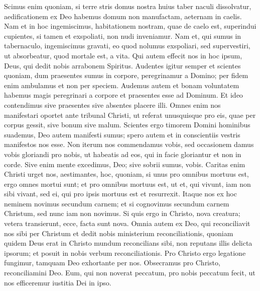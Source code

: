 \begin{biblechapter}  
\verse Scimus enim quoniam, si terre stris domus nostra huius taber naculi dissolvatur, aedificationem ex Deo habemus domum non manufactam, aeternam in caelis. 
\verse Nam et in hoc ingemiscimus, habitationem nostram, quae de caelo est, superindui cupientes, 
\verse si tamen et exspoliati, non nudi inveniamur. 
\verse Nam et, qui sumus in tabernaculo, ingemiscimus gravati, eo quod nolumus exspoliari, sed supervestiri, ut absorbeatur, quod mortale est, a vita. 
\verse Qui autem effecit nos in hoc ipsum, Deus, qui dedit nobis arrabonem Spiritus. 
\verse Audentes igitur semper et scientes quoniam, dum praesentes sumus in corpore, peregrinamur a Domino; 
\verse per fidem enim ambulamus et non per speciem. 
\verse Audemus autem et bonam voluntatem habemus magis peregrinari a corpore et praesentes esse ad Dominum. 
\verse Et ideo contendimus sive praesentes sive absentes placere illi. 
\verse Omnes enim nos manifestari oportet ante tribunal Christi, ut referat unusquisque pro eis, quae per corpus gessit, sive bonum sive malum. 
\verse Scientes ergo timorem Domini hominibus suademus, Deo autem manifesti sumus; spero autem et in conscientiis vestris manifestos nos esse. 
\verse Non iterum nos commendamus vobis, sed occasionem damus vobis gloriandi pro nobis, ut habeatis ad eos, qui in facie gloriantur et non in corde. 
\verse Sive enim mente excedimus, Deo; sive sobrii sumus, vobis. 
\verse Caritas enim Christi urget nos, aestimantes, hoc, quoniam, si unus pro omnibus mortuus est, ergo omnes mortui sunt; 
\verse et pro omnibus mortuus est, ut et, qui vivunt, iam non sibi vivant, sed ei, qui pro ipsis mortuus est et resurrexit. 
\verse Itaque nos ex hoc neminem novimus secundum carnem; et si cognovimus secundum carnem Christum, sed nunc iam non novimus. 
\verse Si quis ergo in Christo, nova creatura; vetera transierunt, ecce, facta sunt nova. 
\verse Omnia autem ex Deo, qui reconciliavit nos sibi per Christum et dedit nobis ministerium reconciliationis, 
\verse quoniam quidem Deus erat in Christo mundum reconcilians sibi, non reputans illis delicta ipsorum; et posuit in nobis verbum reconciliationis. 
\verse Pro Christo ergo legatione fungimur, tamquam Deo exhortante per nos. Obsecramus pro Christo, reconciliamini Deo. 
\verse Eum, qui non noverat peccatum, pro nobis peccatum fecit, ut nos efficeremur iustitia Dei in ipso. 
\end{biblechapter}

